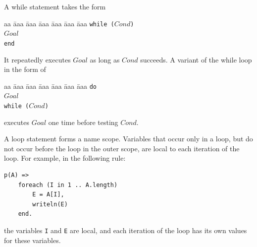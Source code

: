 A while statement takes the form 
\begin{tabbing}
aa \= aaa \= aaa \= aaa \= aaa \= aaa \= aaa \kill
\> \texttt{while ($Cond$)} \\
\> \> $Goal$  \\
\>  \texttt{end}
\end{tabbing} 
It repeatedly executes $Goal$ as long as $Cond$ succeeds. A variant of the while loop in the form of 
\begin{tabbing}
aa \= aaa \= aaa \= aaa \= aaa \= aaa \= aaa \kill
\> \texttt{do} \\
\> \> $Goal$  \\
\>  \texttt{while ($Cond$)}
\end{tabbing}
executes $Goal$ one time before testing $Cond$.

A loop statement forms a name scope. Variables that occur only in a loop, but do not occur before the loop in the outer scope, are local to each iteration of the loop. For example, in the following rule:
\begin{verbatim}
p(A) =>
    foreach (I in 1 .. A.length)
        E = A[I],
        writeln(E)
    end.
\end{verbatim}
the variables \texttt{I} and \texttt{E} are local, and each iteration of the loop has its own values for these variables.

